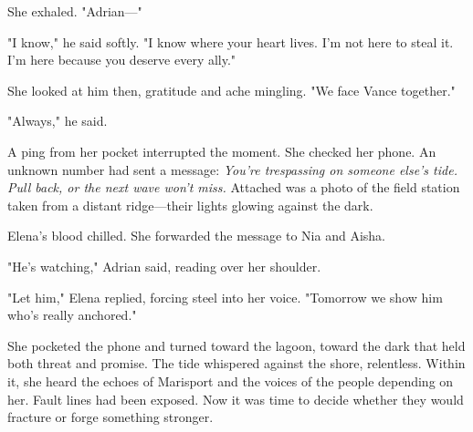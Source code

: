 She exhaled. "Adrian—"

"I know," he said softly. "I know where your heart lives. I'm not here to steal it. I'm here because you deserve every ally."

She looked at him then, gratitude and ache mingling. "We face Vance together."

"Always," he said.

A ping from her pocket interrupted the moment. She checked her phone. An unknown number had sent a message: \textit{You're trespassing on someone else's tide. Pull back, or the next wave won't miss.} Attached was a photo of the field station taken from a distant ridge—their lights glowing against the dark.

Elena's blood chilled. She forwarded the message to Nia and Aisha.

"He's watching," Adrian said, reading over her shoulder.

"Let him," Elena replied, forcing steel into her voice. "Tomorrow we show him who's really anchored."

She pocketed the phone and turned toward the lagoon, toward the dark that held both threat and promise. The tide whispered against the shore, relentless. Within it, she heard the echoes of Marisport and the voices of the people depending on her. Fault lines had been exposed. Now it was time to decide whether they would fracture or forge something stronger.

